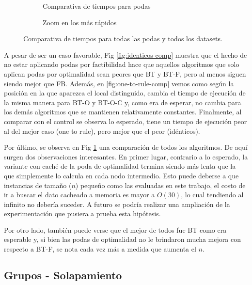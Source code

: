 \begin{figure}[H]
    \centering
    \begin{subfigure}[b]{0.45\textwidth}
        
        \caption{Comparativa de tiempos para podas}
    \end{subfigure}
    \begin{subfigure}[b]{0.45\textwidth}
        
        \caption{Zoom en los más rápidos}
    \end{subfigure}
    \caption{Comparativa de tiempos para todas las podas y todos los datasets.}
    \label{fig:podas-todos}
\end{figure}

A pesar de ser un caso favorable, Fig \ref{fig:identicos-comp} muestra que el hecho de no estar aplicando podas por factibilidad hace que aquellos algoritmos que solo aplican podas por optimalidad sean peores que BT y BT-F, pero al menos siguen siendo mejor que FB. Además, en \ref{fig:one-to-rule-comp} vemos como según la posición en la que aparezca el local distinguido, cambia el tiempo de ejecución de la misma manera para BT-O y BT-O-C y, como era de esperar, no cambia para los demás algoritmos que se mantienen relativamente constantes. Finalmente, al comparar con el control se observa lo esperado, tiene un tiempo de ejecución peor al del mejor caso (one to rule), pero mejor que el peor (idénticos).

Por último, se observa en Fig \ref{fig:podas-todos} una comparación de todos los algoritmos. De aquí surgen dos observaciones interesantes. En primer lugar, contrario a lo esperado, la variante con caché de la poda de optimalidad termina siendo más lenta que la que simplemente lo calcula en cada nodo intermedio. Esto puede deberse a que instancias de tamaño ($n$) pequeño como las evaluadas en este trabajo, el costo de ir a buscar el dato cacheado a memoria es mayor a $O(30)$, lo cual tendiendo al infinito no debería suceder. A futuro se podría realizar una ampliación de la experimentación que pusiera a prueba esta hipótesis.

Por otro lado, también puede verse que el mejor de todos fue BT como era esperable y, si bien las podas de optimalidad no le brindaron mucha mejora con respecto a BT-F, se nota cada vez más a medida que aumenta el $n$.

\subsection{Grupos - Solapamiento}

